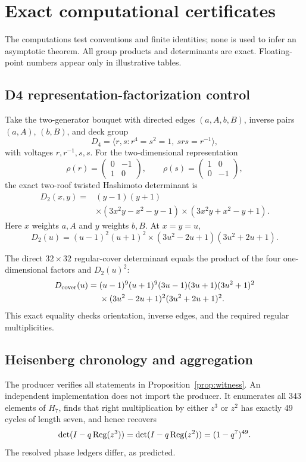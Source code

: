 \section{Exact computational certificates}
\label{sec:certificates}

The computations test conventions and finite identities; none is used to
infer an asymptotic theorem. All group products and determinants are exact.
Floating-point numbers appear only in illustrative tables.

\subsection{D4 representation-factorization control}

Take the two-generator bouquet with directed edges
\((a,A,b,B)\), inverse pairs \((a,A)\), \((b,B)\), and deck group
\[
D_4=\langle r,s:r^4=s^2=1,\ srs=r^{-1}\rangle,
\]
with voltages \(r,r^{-1},s,s\). For the two-dimensional representation
\[
\rho(r)=
\begin{pmatrix}0&-1\\1&0\end{pmatrix},
\qquad
\rho(s)=
\begin{pmatrix}1&0\\0&-1\end{pmatrix},
\]
the exact two-roof twisted Hashimoto determinant is
\[
\begin{split}
D_2(x,y)
={}&(y-1)(y+1)\\
&\times(3x^2y-x^2-y-1)
\times(3x^2y+x^2-y+1).
\end{split}
\]
Here \(x\) weights \(a,A\) and \(y\) weights \(b,B\). At \(x=y=u\),
\[
D_2(u)=
(u-1)^2(u+1)^2
\times(3u^2-2u+1)(3u^2+2u+1).
\]

The direct \(32\times32\) regular-cover determinant equals the product of the
four one-dimensional factors and \(D_2(u)^2\):
\[
\begin{split}
D_{\rm cover}(u)
={}&(u-1)^9(u+1)^9(3u-1)(3u+1)(3u^2+1)^2\\
&\times(3u^2-2u+1)^2(3u^2+2u+1)^2.
\end{split}
\]
This exact equality checks orientation, inverse edges, and the required
regular multiplicities.

\subsection{Heisenberg chronology and aggregation}

The producer verifies all statements in Proposition~\ref{prop:witness}. An
independent implementation does not import the producer. It enumerates all
343 elements of \(H_7\), finds that right multiplication by either
\(z^3\) or \(z^2\) has exactly 49 cycles of length seven, and hence recovers
\[
\det(I-q\operatorname{Reg}(z^3))
=\det(I-q\operatorname{Reg}(z^2))
=(1-q^7)^{49}.
\]
The resolved phase ledgers differ, as predicted.

